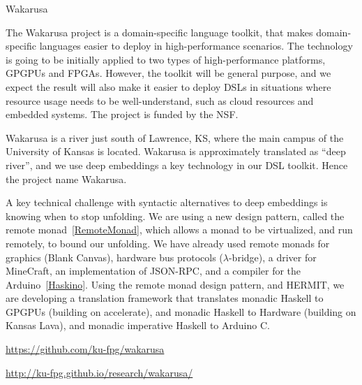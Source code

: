 \begin{hcarentry}{Wakarusa}
\label{Wakarusa}
\makeheader

The Wakarusa project is a domain-specific language toolkit,
that makes domain-specific languages easier to deploy in
high-performance scenarios. The technology is going to be initially
applied to two types of high-performance platforms, GPGPUs and
FPGAs. However, the toolkit will be general purpose, and we expect the
result will also make it easier to deploy DSLs in situations where
resource usage needs to be well-understand, such as cloud resources
and embedded systems. The project is funded by the NSF.

Wakarusa is a river just south of Lawrence, KS, where the main campus
of the University of Kansas is located. Wakarusa is approximately
translated as ``deep river'', and we use deep embeddings a key
technology in our DSL toolkit. Hence the project name Wakarusa.

A key technical challenge with syntactic alternatives to deep embeddings
is knowing when to stop unfolding. We are using a new design pattern,
called the remote monad~\cref{RemoteMonad},
which allows a monad to be virtualized, and run remotely, to bound our unfolding.
%
We have already used remote monads for graphics (Blank Canvas),
hardware bus protocols ($\lambda$-bridge), a driver for MineCraft,
an implementation of JSON-RPC, and a compiler for the Arduino~\cref{Haskino}.
Using the remote monad design pattern, and HERMIT, we are developing
a translation framework that translates monadic Haskell to GPGPUs (building on
accelerate), and monadic Haskell to Hardware (building on Kansas Lava),
and monadic imperative Haskell to Arduino C.

\FurtherReading
\begin{compactitem}
\item
  \url{https://github.com/ku-fpg/wakarusa}
\item
  \url{http://ku-fpg.github.io/research/wakarusa/}
\end{compactitem}
\end{hcarentry}
